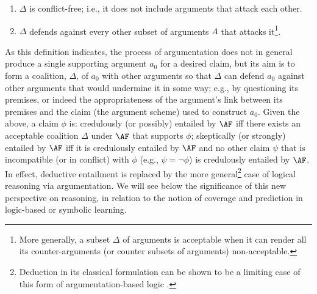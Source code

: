 \begin{enumerate}
\item[\cond{1}] $\Delta$ is conflict-free; i.e., it does not include arguments that attack each other.
\item[\cond{2}] $\Delta$ defends against every other subset of arguments $A$ that attacks it\footnote{More generally, a subset $\Delta$ of arguments is acceptable when it can render all its counter-arguments (or counter subsets of arguments) non-acceptable.}.
\end{enumerate}
As this definition indicates, the process of argumentation does not in general produce a single supporting argument $a_0$ for a desired claim, but its aim is to form a coalition, $\Delta$, of $a_0$ with other arguments so that $\Delta$ can defend $a_0$ against other arguments that would undermine it in some way; e.g., by questioning its premises, or indeed the appropriateness of the argument's link between its premises and the claim (the argument scheme) used to construct $a_0$.
Given the above, a claim $\phi$ is: credulously (or possibly) entailed by $\AF$ iff there exists an acceptable coalition $\Delta$ under $\AF$ that supports $\phi$; skeptically (or strongly) entailed by $\AF$ iff it is credulously entailed by $\AF$ and no other claim $\psi$ that is incompatible (or in conflict) with $\phi$ (e.g., $\psi = \neg \phi$) is credulously entailed by $\AF$. In effect, deductive entailment is replaced by the more general\footnote{Deduction in its classical formulation can be shown to be a limiting case of this form of argumentation-based logic .} case of logical reasoning via argumentation. We will see below the significance of this new perspective on reasoning, in relation to the notion of coverage and prediction in logic-based or symbolic learning.


